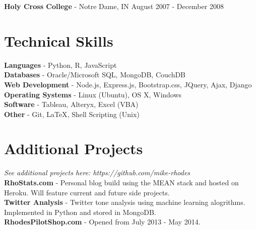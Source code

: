 \documentclass[margin]{res}
\begin{document}
\begin{resume}
\textbf{Holy Cross College} - Notre Dame, IN \hfill August 2007 - December 2008

 
\section{Technical Skills}
    {\bf Languages} - Python, R, JavaScript\\
	{\bf Databases} - Oracle/Microsoft SQL, MongoDB, CouchDB\\
	{\bf Web Development} - Node.js, Express.js, Bootstrap.css, JQuery, Ajax, Django\\
	{\bf Operating Systems} - Linux (Ubuntu), OS X, Windows\\
    {\bf Software} - Tableau, Alteryx, Excel (VBA)\\
    {\bf Other} - Git, {\LaTeX}, Shell Scripting (Unix)
    
\section{Additional Projects} \hfill \textit{See additional projects here: https://github.com/mike-rhodes}\\
	{\bf RhoStats.com} - Personal blog build using the MEAN stack and hosted on Heroku. Will feature current and future side projects.\\
	{\bf Twitter Analysis} - Twitter tone analysis using machine learning alogrithms. Implemented in Python and stored in MongoDB.\\
	{\bf RhodesPilotShop.com} - Opened from July 2013 - May 2014.
	
\end{resume}
\end{document}
